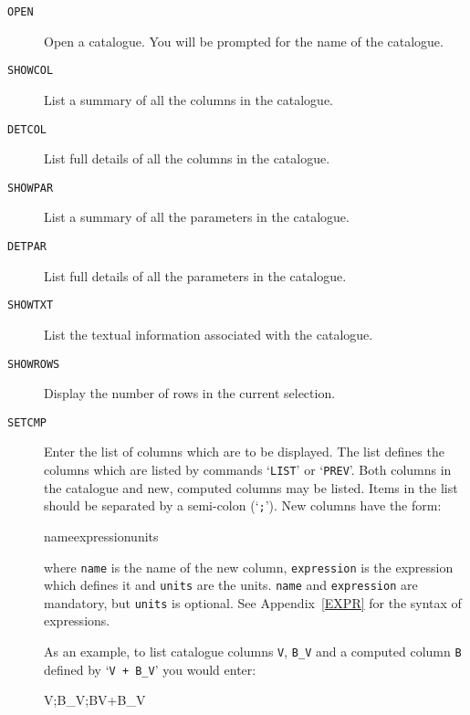 \documentclass[twoside,11pt]{starlink}
\begin{document}
\begin{description}

  \item[ \texttt{OPEN} ] Open a catalogue. You will be prompted for the
   name of the catalogue.

  \item[ \texttt{SHOWCOL} ] List a summary of all the columns in the
   catalogue.

  \item[ \texttt{DETCOL} ] List full details of all the columns in the
   catalogue.

  \item[ \texttt{SHOWPAR} ] List a summary of all the parameters in the
   catalogue.

  \item[ \texttt{DETPAR} ] List full details of all the parameters in the
   catalogue.

  \item[ \texttt{SHOWTXT} ] List the textual information associated with
   the catalogue.

  \item[ \texttt{SHOWROWS} ] Display the number of rows in the current
   selection.

  \item[ \texttt{SETCMP} ] Enter the list of columns which are to be
   displayed.  The list defines the columns which are listed by commands
   `\texttt{LIST}' or `\texttt{PREV}'. Both columns in the catalogue and new,
   computed columns may be listed.  Items in the list should be separated
   by a semi-colon (`\texttt{;}').  New columns have the form:

  \begin{terminalv}
name{expression}units
  \end{terminalv}

   where \texttt{name} is the name of the new column, \texttt{expression} is
   the expression which defines it and \texttt{units} are the units.  \texttt{name} and \texttt{expression} are mandatory, but \texttt{units} is
   optional. See Appendix~\ref{EXPR} for the syntax of expressions.

   As an example, to list catalogue columns \texttt{V}, \texttt{B\_V} and a
   computed column \texttt{B} defined by `\texttt{V + B\_V}' you would enter:

  \begin{terminalv}
V;B_V;B{V+B_V}
  \end{terminalv}


\end{description}
\end{document}
